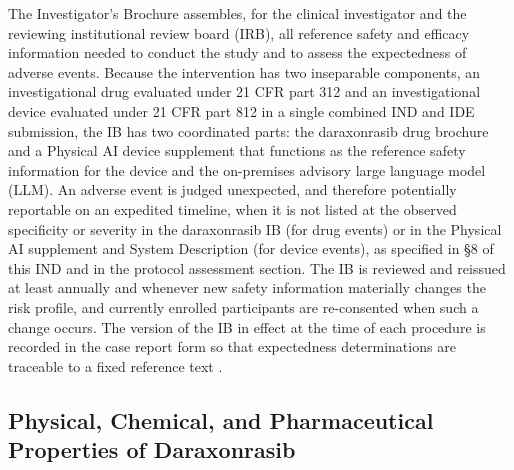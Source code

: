The Investigator's Brochure assembles, for the clinical investigator and the
reviewing institutional review board (IRB), all reference safety and efficacy
information needed to conduct the study and to assess the expectedness of adverse
events. Because the intervention has two inseparable components, an investigational
drug evaluated under 21 CFR part 312 and an investigational device evaluated under
21 CFR part 812 in a single combined IND and IDE submission, the IB has two
coordinated parts: the daraxonrasib drug brochure and a Physical AI device
supplement that functions as the reference safety information for the device and
the on-premises advisory large language model (LLM). An adverse event is judged
unexpected, and therefore potentially reportable on an expedited timeline, when it
is not listed at the observed specificity or severity in the daraxonrasib IB (for
drug events) or in the Physical AI supplement and System Description (for device
events), as specified in \S 8 of this IND and in the protocol assessment section.
The IB is reviewed and reissued at least annually and whenever new safety
information materially changes the risk profile, and currently enrolled
participants are re-consented when such a change occurs. The version of the IB in
effect at the time of each procedure is recorded in the case report form so that
expectedness determinations are traceable to a fixed reference text
\cite{daraxwhipple,cfr312paiuni}.

\subsection*{Physical, Chemical, and Pharmaceutical Properties of Daraxonrasib}

